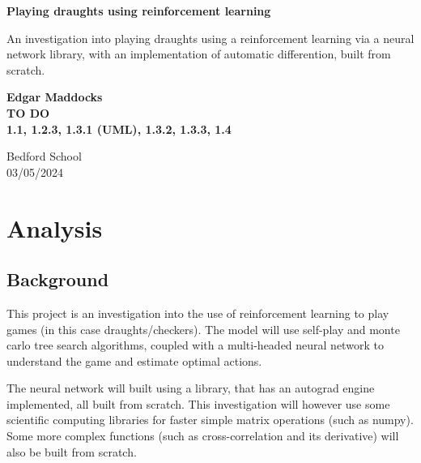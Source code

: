 \documentclass{article}
\begin{document}
\begin{titlepage}
    \begin{center}
        \vspace*{1cm}
            
        \Huge
        \textbf{Playing draughts using reinforcement learning}
            
        \vspace{0.5cm}
        \LARGE
        An investigation into playing draughts using a reinforcement learning via a neural network library, with an implementation of
        automatic differention, built from scratch.
            
        \vspace{1.5cm}
            
        \textbf{Edgar Maddocks}
        \\
        \textbf{TO DO\\ 1.1,  1.2.3, 1.3.1 (UML), 1.3.2, 1.3.3, 1.4}
            
        \vfill
            
        \vspace{0.8cm}
                        
        \Large
        Bedford School\\
        03/05/2024\\
            
    \end{center}
\end{titlepage}

    \pagebreak

    \tableofcontents

    \section{Analysis}
    \subsection{Background}
    This project is an investigation into the use of reinforcement learning to play games (in this case draughts/checkers).
    The model will use self-play and monte carlo tree search algorithms, coupled with a multi-headed neural network to
    understand the game and estimate optimal actions.

    The neural network will built using a library, that has an autograd engine implemented, all built from scratch. This
    investigation will however use some scientific computing libraries for faster simple matrix operations (such as numpy). Some more
    complex functions (such as cross-correlation and its derivative) will also be built from scratch.
\end{document}
